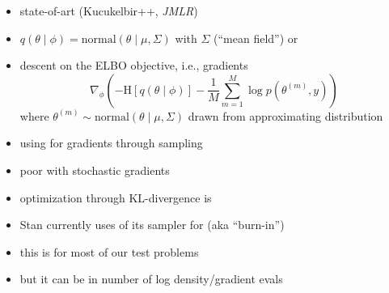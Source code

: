 \documentclass[9pt]{report}
\begin{document}
\begin{itemize}
\item state-of-art  (Kucukelbir++, \textit{JMLR})
\item $q(\theta \mid \phi) = \textrm{normal}(\theta \mid \mu, \Sigma)$ with $\Sigma$  (``mean field'') or 
\item {} descent on the ELBO objective, i.e., gradients
  \[
    \nabla_{\phi} \left( -\textrm{H}\!\left[q(\theta \mid \phi)\right] - \frac{1}{M} \sum_{m=1}^M \log p(\theta^{(m)}, y) \right)
  \]
  where $\theta^{(m)} \sim \textrm{normal}(\theta \mid \mu, \Sigma)$ drawn from approximating distribution
\item using  for gradients through sampling
\item poor  with stochastic gradients
\item optimization through KL-divergence is 
\end{itemize}

\begin{itemize}
\item Stan currently uses  of its sampler for  (aka ``burn-in'')
\item this is  for most of our test problems 
\item but it can be  in number of log density/gradient evals
\end{itemize}
\end{document}
